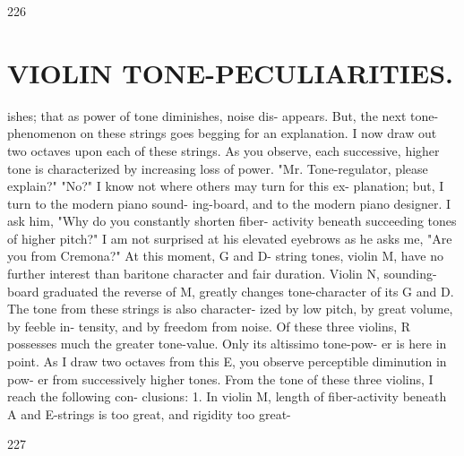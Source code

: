 \documentclass{article}
\begin{document}
226

\section*{VIOLIN TONE-PECULIARITIES.}
ishes; that as power of tone diminishes, noise dis- appears. But, the next tone-phenomenon on these strings goes begging for an explanation. I now draw out two octaves upon each of these strings. As you observe, each successive, higher tone is characterized by increasing loss of power. "Mr. Tone-regulator, please explain?" "No?" I know not where others may turn for this ex- planation; but, I turn to the modern piano sound- ing-board, and to the modern piano designer. I ask him, "Why do you constantly shorten fiber- activity beneath succeeding tones of higher pitch?" I am not surprised at his elevated eyebrows as he asks me, "Are you from Cremona?" At this moment, G and D- string tones, violin M, have no further interest than baritone character and fair duration. Violin N, sounding- board graduated the reverse of M, greatly changes tone-character of its G and D. The tone from these strings is also character- ized by low pitch, by great volume, by feeble in- tensity, and by freedom from noise. Of these three violins, R possesses much the greater tone-value. Only its altissimo tone-pow- er is here in point. As I draw two octaves from this E, you observe perceptible diminution in pow- er from successively higher tones. From the tone of these three violins, I reach the following con- clusions: 1. In violin M, length of fiber-activity beneath A and E-strings is too great, and rigidity too great-

227
\end{document}
